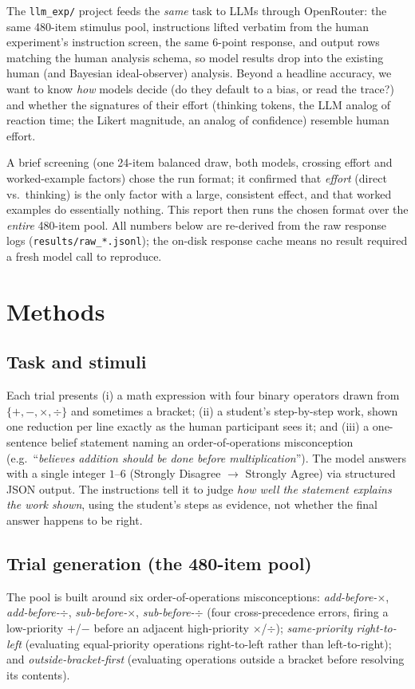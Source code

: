 \documentclass[11pt]{article}
\begin{document}
The \texttt{llm\_exp/} project feeds the \emph{same} task to LLMs through OpenRouter: the same
480-item stimulus pool, instructions lifted verbatim from the human experiment's instruction
screen, the same 6-point response, and output rows matching the human analysis schema, so
model results drop into the existing human (and Bayesian ideal-observer) analysis. Beyond a
headline accuracy, we want to know \emph{how} models decide (do they default to a bias, or
read the trace?) and whether the signatures of their effort (thinking tokens, the LLM
analog of reaction time; the Likert magnitude, an analog of confidence) resemble human effort.

A brief screening (one 24-item balanced draw, both models, crossing effort and worked-example
factors) chose the run format; it confirmed that \emph{effort} (direct vs.\ thinking) is the
only factor with a large, consistent effect, and that worked examples do essentially nothing.
This report then runs the chosen format over the \emph{entire} 480-item pool. All numbers
below are re-derived from the raw response logs (\texttt{results/raw\_*.jsonl}); the on-disk
response cache means no result required a fresh model call to reproduce.

\section{Methods}

\subsection{Task and stimuli}
Each trial presents (i) a math expression with four binary operators drawn from
$\{+,-,\times,\div\}$ and sometimes a bracket; (ii) a student's step-by-step work, shown one
reduction per line exactly as the human participant sees it; and (iii) a one-sentence belief
statement naming an order-of-operations misconception (e.g.\ ``\emph{believes addition should
be done before multiplication}''). The model answers with a single integer $1$--$6$
(Strongly Disagree $\to$ Strongly Agree) via structured JSON output. The instructions tell it
to judge \emph{how well the statement explains the work shown}, using the student's steps as
evidence, not whether the final answer happens to be right.

\subsection{Trial generation (the 480-item pool)}
The pool is built around six order-of-operations misconceptions:
\emph{add-before-$\times$}, \emph{add-before-$\div$}, \emph{sub-before-$\times$},
\emph{sub-before-$\div$} (four cross-precedence errors, firing a low-priority $+$/$-$ before an
adjacent high-priority $\times$/$\div$); \emph{same-priority right-to-left} (evaluating
equal-priority operations right-to-left rather than left-to-right); and
\emph{outside-bracket-first} (evaluating operations outside a bracket before resolving its
contents).
\end{document}
